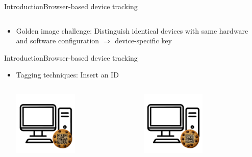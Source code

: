 \documentclass[aspectratio=169, hyperref={colorlinks=true, allcolors=SecondaryColor}, c]{beamer}
\begin{document}
\begin{frame}[fragile]{Introduction}{Browser-based device tracking}
\begin{columns}
\begin{column}{0.33\textwidth}
			\end{column}
		\end{columns}
		\vspace{-0.5cm}
		\begin{itemize}
			\item \alert{Golden image challenge:} Distinguish identical devices with same hardware and software configuration \checkboxUnchecked \alert{$\Rightarrow$ device-specific key}
		\end{itemize}
	\end{frame}

	\begin{frame}[fragile]{Introduction}{Browser-based device tracking}
		\begin{itemize}
			\item \alert{Tagging techniques:} Insert an ID
			\begin{columns}
				\begin{column}{0.33\textwidth}
					\includegraphics[width=0.5\textwidth, center]{./figures/computer_alpha_cookie_1.png}
				\end{column}
				\begin{column}{0.33\textwidth}
					\includegraphics[width=0.5\textwidth, center]{./figures/computer_alpha_cookie_2.png}
				\end{column}

\end{columns}
\end{itemize}
\end{frame}
\end{document}
